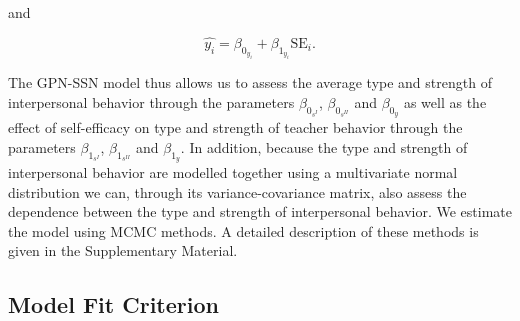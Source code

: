 \documentclass[man]{apa6}
\begin{document}
\noindent and

\[\hat{y_i} = \beta_{0_{y_i}} +
\beta_{1_{y_i}}\text{SE}_i.\]

\noindent The GPN-SSN model thus allows us to assess the average type and
strength of interpersonal behavior through the parameters \(\beta_{0_{s^{I}}}\),
\(\beta_{0_{s^{II}}}\) and \(\beta_{0_{y}}\) as well as the effect of self-efficacy
on type and strength of teacher behavior through the parameters
\(\beta_{1_{s^{I}}}\), \(\beta_{1_{s^{II}}}\) and \(\beta_{1_{y}}\). In addition,
because the type and strength of interpersonal behavior are modelled together
using a multivariate normal distribution we can, through its variance-covariance
matrix, also assess the dependence between the type and strength of interpersonal
behavior. \newline
\indent We estimate the model using MCMC methods. A detailed description of these
methods is given in the Supplementary Material.

\subsection{Model Fit Criterion}\label{Modelfit}
\end{document}
